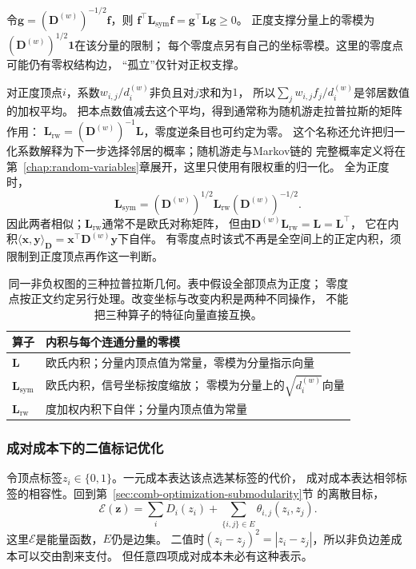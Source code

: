 令\(\bm g=(\bm D^{(w)})^{-1/2}\bm f\)，则
\(\bm f^\top\bm L_{\mathrm{sym}}\bm f=\bm g^\top\bm L\bm g\geq0\)。
正度支撑分量上的零模为\((\bm D^{(w)})^{1/2}\bm1\)在该分量的限制；
每个零度点另有自己的坐标零模。这里的零度点可能仍有零权结构边，
“孤立”仅针对正权支撑。

对正度顶点\(i\)，系数\(w_{i,j}/d_i^{(w)}\)非负且对\(j\)求和为\(1\)，
所以\(\sum_j w_{i,j}f_j/d_i^{(w)}\)是邻居数值的加权平均。
把本点数值减去这个平均，得到通常称为随机游走拉普拉斯的矩阵作用：
\(\bm L_{\mathrm{rw}}=(\bm D^{(w)})^{-1}\bm L\)，零度逆条目也可约定为零。
这个名称还允许把归一化系数解释为下一步选择邻居的概率；随机游走与Markov链的
完整概率定义将在第~\ref{chap:random-variables}章展开，这里只使用有限权重的归一化。
全为正度时，
\[
  \bm L_{\mathrm{sym}}
  =(\bm D^{(w)})^{1/2}\bm L_{\mathrm{rw}}(\bm D^{(w)})^{-1/2}.
\]
因此两者相似；\(\bm L_{\mathrm{rw}}\)通常不是欧氏对称矩阵，
但由\(\bm D^{(w)}\bm L_{\mathrm{rw}}=\bm L=\bm L^\top\)，
它在内积\(\langle\bm x,\bm y\rangle_{\bm D}
=\bm x^\top\bm D^{(w)}\bm y\)下自伴。
有零度点时该式不再是全空间上的正定内积，须限制到正度顶点再作这一判断。

\begin{table}[htbp]
  \centering\small
  \begin{tabularx}{\linewidth}{@{}lX@{}}
    \toprule
    算子 & 内积与每个连通分量的零模\\
    \midrule
    \(\bm L\) & 欧氏内积；分量内顶点值为常量，零模为分量指示向量\\
    \(\bm L_{\mathrm{sym}}\) & 欧氏内积，信号坐标按度缩放；
      零模为分量上的\(\sqrt{d_i^{(w)}}\)向量\\
    \(\bm L_{\mathrm{rw}}\) & 度加权内积下自伴；分量内顶点值为常量\\
    \bottomrule
  \end{tabularx}
  \caption{同一非负权图的三种拉普拉斯几何。表中假设全部顶点为正度；
  零度点按正文约定另行处理。改变坐标与改变内积是两种不同操作，
  不能把三种算子的特征向量直接互换。}
  \label{tab:graph-theory-laplacian-geometries}
\end{table}

\subsubsection{成对成本下的二值标记优化}

令顶点标签\(z_i\in\{0,1\}\)。一元成本表达该点选某标签的代价，
成对成本表达相邻标签的相容性。回到第~\ref{sec:comb-optimization-submodularity}节
的离散目标，
\begin{equation}
  \mathcal E(\bm z)=\sum_iD_i(z_i)
  +\sum_{\{i,j\}\in E}\theta_{i,j}(z_i,z_j).
  \label{eq:graph-theory-binary-pairwise-energy}
\end{equation}
这里\(\mathcal E\)是能量函数，\(E\)仍是边集。
二值时\((z_i-z_j)^2=|z_i-z_j|\)，所以非负边差成本可以交由割来支付。
但任意四项成对成本未必有这种表示。

